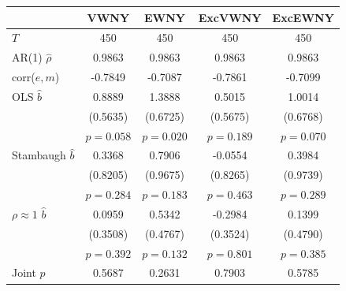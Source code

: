 \begin{tabular}{lcccc}
\toprule
 & VWNY & EWNY & ExcVWNY & ExcEWNY \\
\midrule
$T$ & 450 & 450 & 450 & 450 \\
AR(1) $\hat\rho$ & 0.9863 & 0.9863 & 0.9863 & 0.9863 \\
corr($e,m$) & -0.7849 & -0.7087 & -0.7861 & -0.7099 \\
\midrule
OLS $\hat b$ & 0.8889 & 1.3888 & 0.5015 & 1.0014 \\
 & (0.5635) & (0.6725) & (0.5675) & (0.6768) \\
 & $p=0.058$ & $p=0.020$ & $p=0.189$ & $p=0.070$ \\
Stambaugh $\hat b$ & 0.3368 & 0.7906 & -0.0554 & 0.3984 \\
 & (0.8205) & (0.9675) & (0.8265) & (0.9739) \\
 & $p=0.284$ & $p=0.183$ & $p=0.463$ & $p=0.289$ \\
$\rho\approx1$ $\hat b$ & 0.0959 & 0.5342 & -0.2984 & 0.1399 \\
 & (0.3508) & (0.4767) & (0.3524) & (0.4790) \\
 & $p=0.392$ & $p=0.132$ & $p=0.801$ & $p=0.385$ \\
\midrule
Joint $p$ & 0.5687 & 0.2631 & 0.7903 & 0.5785 \\
\bottomrule
\end{tabular}
